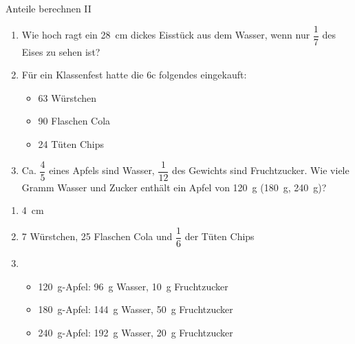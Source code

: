 \documentclass[12pt,a5paper,landscape]{scrartcl}
\begin{document}
	\begin{karte2}{Anteile berechnen II}
		\begin{enumerate}
			\item Wie hoch ragt ein \SI{28}{\centi\meter} dickes Eisstück aus dem Wasser, wenn nur $\dfrac{1}{7}$ des Eises zu sehen ist?
			
			\item Für ein Klassenfest hatte die 6c folgendes eingekauft:
			\begin{itemize}
				\item 63 Würstchen
				\item 90 Flaschen Cola
				\item 24 Tüten Chips
			\end{itemize}
			
			\item Ca. $\dfrac{4}{5}$ eines Apfels sind Wasser, $\dfrac{1}{12}$ des Gewichts sind Fruchtzucker. Wie viele Gramm Wasser und Zucker enthält ein Apfel von \SI{120}{\gram} (\SI{180}{\gram},  \SI{240}{\gram})?
		\end{enumerate}
	\end{karte2}
	
	\begin{loesungskarte}
		\begin{enumerate}
			\item \SI{4}{\centi\meter}
			
			\item 7 Würstchen, 25 Flaschen Cola und $\dfrac{1}{6}$ der Tüten Chips
			
			\item \begin{itemize}
				\item \SI{120}{\gram}-Apfel:\hspace{1cm} \SI{96}{\gram} Wasser, \SI{10}{\gram} Fruchtzucker
				\item \SI{180}{\gram}-Apfel:\hspace{1cm} \SI{144}{\gram} Wasser, \SI{50}{\gram} Fruchtzucker
				\item \SI{240}{\gram}-Apfel:\hspace{1cm} \SI{192}{\gram} Wasser, \SI{20}{\gram} Fruchtzucker
			\end{itemize}
		\end{enumerate}
	\end{loesungskarte}
	
\end{document}
